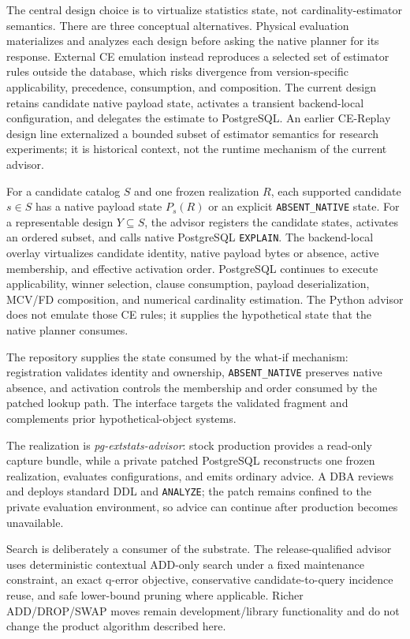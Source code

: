 The central design choice is to virtualize statistics state, not
cardinality-estimator semantics. There are three conceptual alternatives.
Physical evaluation materializes and analyzes each design before asking the
native planner for its response. External CE emulation instead reproduces a
selected set of estimator rules outside the database, which risks divergence
from version-specific applicability, precedence, consumption, and composition.
The current design retains candidate native payload state, activates a
transient backend-local configuration, and delegates the estimate to
PostgreSQL. An earlier CE-Replay design line externalized a bounded subset of
estimator semantics for research experiments; it is historical context, not
the runtime mechanism of the current advisor.

For a candidate catalog $S$ and one frozen realization $R$, each supported
candidate $s\in S$ has a native payload state $P_s(R)$ or an explicit
\texttt{ABSENT\_NATIVE} state. For a representable design $Y\subseteq S$, the
advisor registers the candidate states, activates an ordered subset, and calls
native PostgreSQL \texttt{EXPLAIN}. The backend-local overlay virtualizes
candidate identity, native payload bytes or absence, active membership, and
effective activation order. PostgreSQL continues to execute applicability,
winner selection, clause consumption, payload deserialization, MCV/FD
composition, and numerical cardinality estimation. The Python advisor does
not emulate those CE rules; it supplies the hypothetical state that the native
planner consumes.

The repository supplies the state consumed by the what-if mechanism:
registration validates identity and ownership, \texttt{ABSENT\_NATIVE}
preserves native absence, and activation controls the membership and order
consumed by the patched lookup path.  The interface targets the validated
fragment and complements prior hypothetical-object systems.

The realization is \emph{pg-extstats-advisor}: stock production provides a
read-only capture bundle, while a private patched PostgreSQL reconstructs one
frozen realization, evaluates configurations, and emits ordinary advice.  A
DBA reviews and deploys standard DDL and \texttt{ANALYZE}; the patch remains
confined to the private evaluation environment, so advice can continue after
production becomes unavailable.

Search is deliberately a consumer of the substrate. The release-qualified
advisor uses deterministic contextual ADD-only
search under a fixed maintenance constraint, an exact q-error objective,
conservative candidate-to-query incidence reuse, and safe lower-bound pruning
where applicable. Richer ADD/DROP/SWAP moves remain development/library
functionality and do not change the product algorithm described here.

